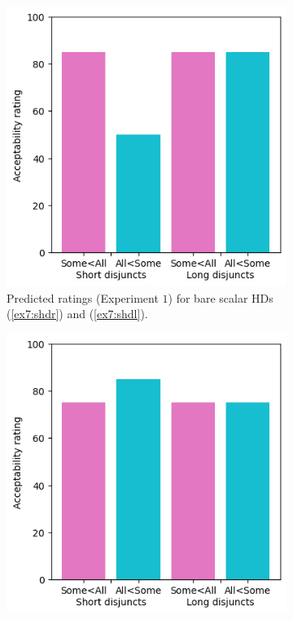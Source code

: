 \begin{figure}[H]
	\centering
	\begin{subfigure}[t]{.3\linewidth}
		\centering
		\includegraphics[width=\linewidth]{./images/pred-1a+2-noonly.png}
		\caption[]{Predicted ratings (Experiment $1$) for bare scalar HDs (\ref{ex7:shdr}) and (\ref{ex7:shdl}).}
	\end{subfigure}
	\hfill
	\begin{subfigure}[t]{.3\linewidth}
		\centering
		\includegraphics[width=\linewidth]{./images/pred-1a+2-only.png}

\end{subfigure}
\end{figure}
